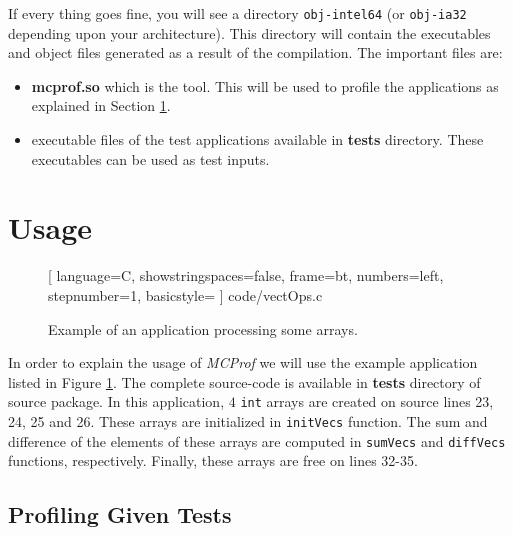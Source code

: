 \documentclass[10pt]{article}
\newcommand{\MCPROF}{\emph{MCProf}}
\begin{document}
If every thing goes fine, you will see a directory \verb|obj-intel64| (or
\verb|obj-ia32| depending upon your architecture). This directory will contain
the executables and object files generated as a result of the compilation. The
important files are:

\begin{itemize}

\item \textbf{mcprof.so} which is the tool. This will be used to profile the
    applications as explained in Section \ref{sec:usage}.

\item executable files of the test applications available in \textbf{tests}
    directory.  These executables can be used as test inputs.

\end{itemize}



\section{Usage}
\label{sec:usage}

\begin{figure}%
    \centering
%     
    
    [
    language=C,
    showstringspaces=false,
    frame=bt,
    numbers=left,
    stepnumber=1,
    basicstyle=\scriptsize
    ] {code/vectOps.c}
    \caption{Example of an application processing some arrays.}
    \label{fig:vectOps}
\end{figure}

In order to explain the usage of \MCPROF{} we will use the example application
listed in Figure \ref{fig:vectOps}. The complete source-code is available in
\textbf{tests} directory of source package. In this application, $4$ \verb|int|
arrays are created on source lines 23, 24, 25 and 26. These arrays are
initialized in \verb|initVecs| function. The sum and difference of the elements
of these arrays are computed in \verb|sumVecs| and \verb|diffVecs| functions,
respectively.  Finally, these arrays are free on lines 32-35.

\subsection{Profiling Given Tests}
\end{document}
